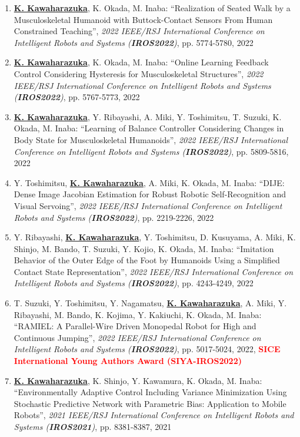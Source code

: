 \documentclass[letterpaper,11pt]{article}
\begin{document}
\begin{enumerate}
\item \underline{\textbf{K. Kawaharazuka}}, K. Okada, M. Inaba: ``Realization of Seated Walk by a Musculoskeletal Humanoid with Buttock-Contact Sensors From Human Constrained Teaching'', \textit{2022 IEEE/RSJ International Conference on Intelligent Robots and Systems (\textit{\textbf{IROS2022}})}, pp. 5774-5780, 2022
\item \underline{\textbf{K. Kawaharazuka}}, K. Okada, M. Inaba: ``Online Learning Feedback Control Considering Hysteresis for Musculoskeletal Structures'', \textit{2022 IEEE/RSJ International Conference on Intelligent Robots and Systems (\textit{\textbf{IROS2022}})}, pp. 5767-5773, 2022
\item \underline{\textbf{K. Kawaharazuka}}, Y. Ribayashi, A. Miki, Y. Toshimitsu, T. Suzuki, K. Okada, M. Inaba: ``Learning of Balance Controller Considering Changes in Body State for Musculoskeletal Humanoids'', \textit{2022 IEEE/RSJ International Conference on Intelligent Robots and Systems (\textit{\textbf{IROS2022}})}, pp. 5809-5816, 2022
\item Y. Toshimitsu, \underline{\textbf{K. Kawaharazuka}}, A. Miki, K. Okada, M. Inaba: ``DIJE: Dense Image Jacobian Estimation for Robust Robotic Self-Recognition and Visual Servoing'', \textit{2022 IEEE/RSJ International Conference on Intelligent Robots and Systems (\textit{\textbf{IROS2022}})}, pp. 2219-2226, 2022
\item Y. Ribayashi, \underline{\textbf{K. Kawaharazuka}}, Y. Toshimitsu, D. Kusuyama, A. Miki, K. Shinjo, M. Bando, T. Suzuki, Y. Kojio, K. Okada, M. Inaba: ``Imitation Behavior of the Outer Edge of the Foot by Humanoids Using a Simplified Contact State Representation'', \textit{2022 IEEE/RSJ International Conference on Intelligent Robots and Systems (\textit{\textbf{IROS2022}})}, pp. 4243-4249, 2022
\item T. Suzuki, Y. Toshimitsu, Y. Nagamatsu, \underline{\textbf{K. Kawaharazuka}}, A. Miki, Y. Ribayashi, M. Bando, K. Kojima, Y. Kakiuchi, K. Okada, M. Inaba: ``RAMIEL: A Parallel-Wire Driven Monopedal Robot for High and Continuous Jumping'', \textit{2022 IEEE/RSJ International Conference on Intelligent Robots and Systems (\textit{\textbf{IROS2022}})}, pp. 5017-5024, 2022, \textbf{\textcolor{red}{SICE International Young Authors Award (SIYA-IROS2022)}}
\item \underline{\textbf{K. Kawaharazuka}}, K. Shinjo, Y. Kawamura, K. Okada, M. Inaba: ``Environmentally Adaptive Control Including Variance Minimization Using Stochastic Predictive Network with Parametric Bias: Application to Mobile Robots'', \textit{2021 IEEE/RSJ International Conference on Intelligent Robots and Systems (\textit{\textbf{IROS2021}})}, pp. 8381-8387, 2021

\end{enumerate}
\end{document}
